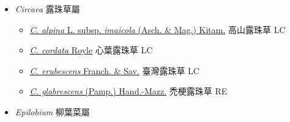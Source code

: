 
  \begin{itemize}
 \item[] \textit{Circaea} 露珠草屬
                                
  \begin{itemize}
        \item[] \href{http://www.theplantlist.org/tpl1.1/search?q=Circaea+alpina+subsp.+imaicola}{\textit{C. alpina} L. subsp. \textit{imaicola} (Asch. \& Mag.) Kitam.}   高山露珠草   LC
        \item[] \href{http://www.theplantlist.org/tpl1.1/search?q=Circaea+cordata}{\textit{C. cordata} Royle}   心葉露珠草   LC
        \item[] \href{http://www.theplantlist.org/tpl1.1/search?q=Circaea+erubescens}{\textit{C. erubescens} Franch. \& Sav.}   臺灣露珠草   LC
        \item[] \href{http://www.theplantlist.org/tpl1.1/search?q=Circaea+glabrescens}{\textit{C. glabrescens} (Pamp.) Hand.-Mazz.}   禿梗露珠草   RE
  \end{itemize}
 \item[] \textit{Epilobium} 柳葉菜屬
                                

\end{itemize}
